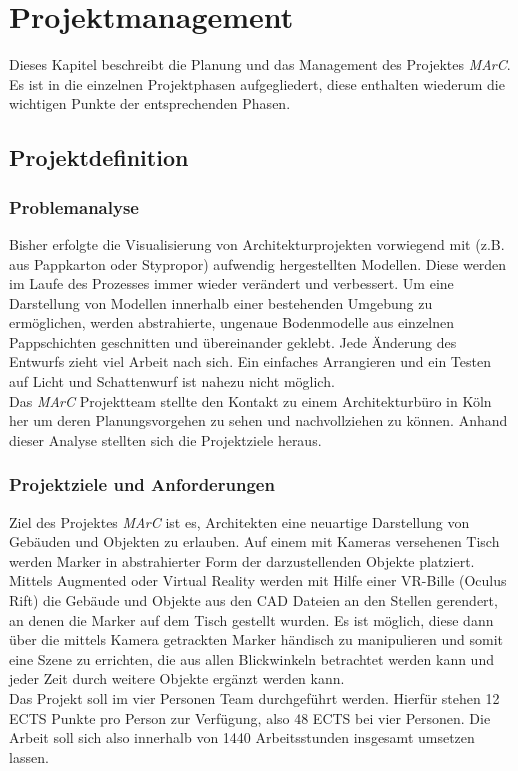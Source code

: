 \section{Projektmanagement} \label{sec:pm}

Dieses Kapitel beschreibt die Planung und das Management des Projektes \textit{MArC}. Es ist in die einzelnen Projektphasen aufgegliedert, diese enthalten wiederum die wichtigen Punkte der entsprechenden Phasen.

\subsection{Projektdefinition}
\subsubsection{Problemanalyse}
\label{sec:problemanalye}
Bisher erfolgte die Visualisierung von Architekturprojekten vorwiegend mit (z.B. aus Pappkarton oder Stypropor) aufwendig hergestellten Modellen. Diese werden im Laufe des Prozesses immer wieder verändert und verbessert.
Um eine Darstellung von Modellen innerhalb einer bestehenden Umgebung zu ermöglichen, werden abstrahierte, ungenaue Bodenmodelle aus einzelnen Pappschichten geschnitten und übereinander geklebt. Jede Änderung des Entwurfs zieht viel Arbeit nach sich. Ein einfaches Arrangieren und ein Testen auf Licht und Schattenwurf ist nahezu nicht möglich.\\
Das \textit{MArC} Projektteam stellte den Kontakt zu einem Architekturbüro in Köln her um deren Planungsvorgehen zu sehen und nachvollziehen zu können. Anhand dieser Analyse stellten sich die Projektziele heraus.


\subsubsection{Projektziele und Anforderungen}
Ziel des Projektes \textit{MArC} ist es, Architekten eine neuartige Darstellung von Gebäuden und Objekten zu erlauben. Auf einem mit Kameras versehenen Tisch werden Marker in abstrahierter Form der darzustellenden Objekte platziert. Mittels Augmented oder Virtual Reality werden mit Hilfe einer VR-Bille (Oculus Rift) die Gebäude und Objekte aus den CAD Dateien an den Stellen gerendert, an denen die Marker auf dem Tisch gestellt wurden.
Es ist möglich, diese dann über die mittels Kamera getrackten Marker händisch zu manipulieren und somit eine Szene zu errichten, die aus allen Blickwinkeln betrachtet werden kann und jeder Zeit durch weitere Objekte ergänzt werden kann. \\
Das Projekt soll im vier Personen Team durchgeführt werden. Hierfür stehen 12 ECTS Punkte pro Person zur Verfügung, also 48 ECTS bei vier Personen. Die Arbeit soll sich also innerhalb von 1440 Arbeitsstunden insgesamt umsetzen lassen.


